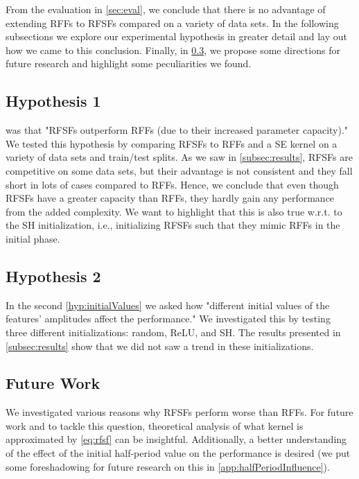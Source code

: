 From the evaluation in \cref{sec:eval}, we conclude that there is no advantage of extending \acp{RFF} to \acp{RFSF} compared on a variety of data sets.
In the following subsections we explore our experimental hypothesis in greater detail and lay out how we came to this conclusion.
Finally, in \cref{subsec:future}, we propose some directions for future research and highlight some peculiarities we found.

\subsection{Hypothesis 1}
	 was that "\acp{RFSF} outperform \acp{RFF} (due to their increased parameter capacity)."
	We tested this hypothesis by comparing \acp{RFSF} to \acp{RFF} and a \ac{SE} kernel on a variety of data sets and train/test splits.
	As we saw in \cref{subsec:results}, \acp{RFSF} are competitive on some data sets, but their advantage is not consistent and they fall short in lots of cases compared to \acp{RFF}.
	Hence, we conclude that even though \acp{RFSF} have a greater capacity than \acp{RFF}, they hardly gain any performance from the added complexity.
	We want to highlight that this is also true w.r.t. to the \ac{SH} initialization, i.e., initializing \acp{RFSF} such that they mimic \acp{RFF} in the initial phase.

\subsection{Hypothesis 2}
	In the second \cref{hyp:initialValues} we asked how "different initial values of the features' amplitudes affect the performance."
	We investigated this by testing three different initializations: random, \ac{ReLU}, and \ac{SH}.
	The results presented in \cref{subsec:results} show that we did not saw a trend in these initializations.

\subsection{Future Work}  \label{subsec:future}
	We investigated various reasons why \acp{RFSF} perform worse than \acp{RFF}.
	For future work and to tackle this question, theoretical analysis of what kernel is approximated by \cref{eq:rfsf} can be insightful.
	Additionally, a better understanding of the effect of the initial half-period value on the performance is desired (we put some foreshadowing for future research on this in \cref{app:halfPeriodInfluence}).
